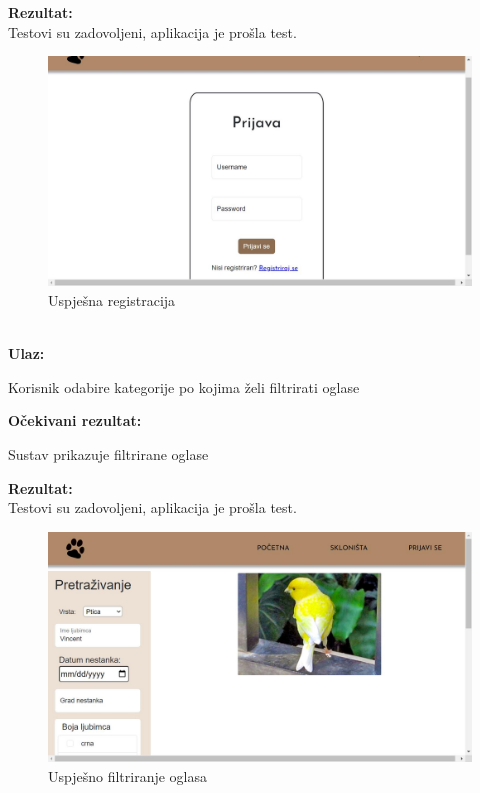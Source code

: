 			\noindent \textbf{Rezultat:}\\
			Testovi su zadovoljeni, aplikacija je prošla test.\\
			\begin{figure}[H]
				\includegraphics[width=\textwidth]{uspjesna_registracija.JPEG}
				\centering
				\caption{Uspješna registracija}
				\label{fig:uspjesnaregistracija}
			\end{figure}
			
			\noindent {}\\
			\textbf{Ulaz: }	
			\begin{packed_enum}
				\item Korisnik odabire kategorije po kojima želi filtrirati oglase
				
			\end{packed_enum}
			
			\noindent \textbf{Očekivani rezultat:}
			
			\begin{packed_enum}
				\item Sustav prikazuje filtrirane oglase
				
			\end{packed_enum}
			
			\noindent \textbf{Rezultat:}\\
			Testovi su zadovoljeni, aplikacija je prošla test.\\
			\begin{figure}[H]
				\includegraphics[width=\textwidth]{uspjesan_filter.JPEG}
				\centering
				\caption{Uspješno filtriranje oglasa}
				\label{fig:uspjesanfilter}
			\end{figure}
			
